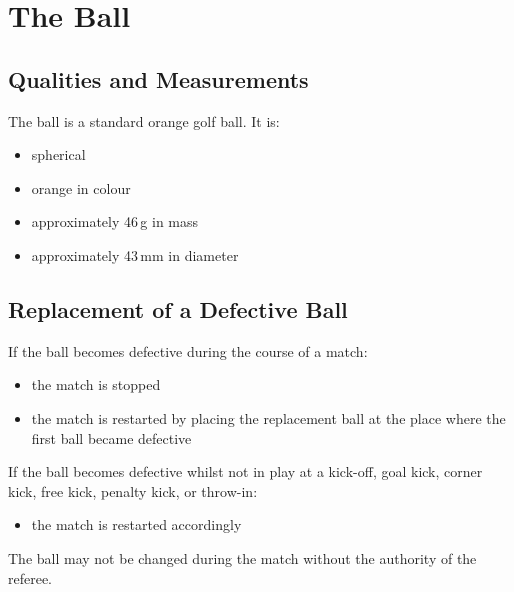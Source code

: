 \section{The Ball}\label{sec:ball}

\subsection{Qualities and Measurements}
The ball is a standard orange golf ball.
It is:
\begin{itemize}
\item spherical
\item orange in colour
\item approximately 46\,g in mass
\item approximately 43\,mm in diameter
\end{itemize}

\subsection{Replacement of a Defective Ball}
If the ball becomes defective during the course of a match:
\begin{itemize}
\item the match is stopped
\item the match is restarted by placing the replacement ball at the place where the first ball became defective
\end{itemize}

If the ball becomes defective whilst not in play at a kick-off, goal kick, corner kick, free kick, penalty kick, or throw-in:
\begin{itemize}
\item the match is restarted accordingly
\end{itemize}

The ball may not be changed during the match without the authority of the referee.
